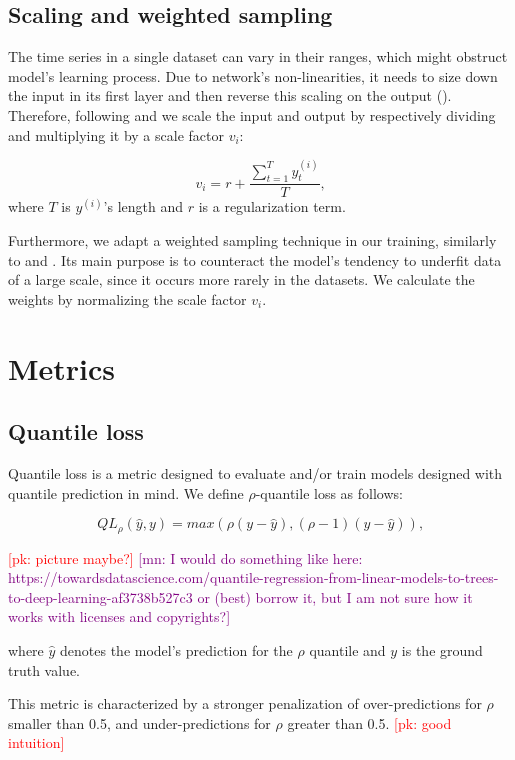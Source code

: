 \documentclass[en]{pracamgr}
\newcommand{\pk}[1]{\textcolor{red}{\small [pk: #1]}}
\newcommand{\mn}[1]{\textcolor{purple}{\small [mn: #1]}}
\begin{document}
\subsection{Scaling and weighted sampling}\label{s:scale}

The time series in a single dataset can vary in their ranges, which might obstruct model's learning process. Due to network's non-linearities, it needs to size down the input in its first layer and then reverse this scaling on the output (\cite{deepar}). Therefore, following \cite{enhancing} and \cite{deepar} we scale the input and output by respectively dividing and multiplying it by a scale factor $v_i$:

$$ v_i = r + \frac{\sum^{T}_{t=1} y^{(i)}_t}{T} \text{,}$$
where $T$ is $y^{(i)}$'s length and $r$ is a regularization term.

Furthermore, we adapt a weighted sampling technique in our training, similarly to \cite{enhancing} and \cite{deepar}. Its main purpose is to counteract the model's tendency to underfit data of a large scale, since it occurs more rarely in the datasets. 
We calculate the weights by normalizing the scale factor $v_i$.

\section{Metrics}

\subsection{Quantile loss}

Quantile loss is a metric designed to evaluate and/or train models designed with quantile prediction in mind.
We define $\rho$-quantile loss as follows:

$$ QL_\rho(\hat{y}, y) = max(\rho(y - \hat{y}), (\rho - 1)(y - \hat{y})) \text{,} $$

\pk{picture maybe?} \mn{I would do something like here: https://towardsdatascience.com/quantile-regression-from-linear-models-to-trees-to-deep-learning-af3738b527c3 or (best) borrow it, but I am not sure how it works with licenses and copyrights?}

where $\hat{y}$ denotes the model's prediction for the $\rho$ quantile and $y$ is the ground truth value.

This metric is characterized by a stronger penalization of over-predictions for $\rho$ smaller than 0.5, and under-predictions for $\rho$ greater than 0.5. \pk{good intuition}
\end{document}
